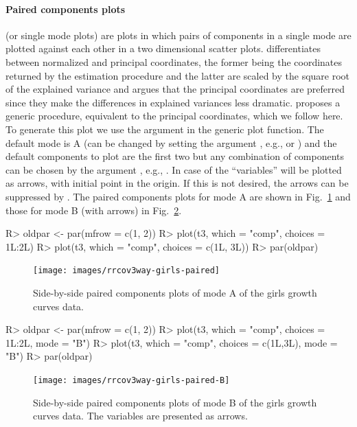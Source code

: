 \documentclass[article,shortnames, nojss]{jss}
\begin{document}
\paragraph{Paired components plots} (or single mode plots)
are plots in which pairs of components in a single mode
are plotted against each other in a two dimensional scatter plots.
\citet{kroonenberg:2008} differentiates between normalized
and principal coordinates, the former being the coordinates
returned by the estimation procedure and the latter are scaled
by the square root of the explained variance and argues that the
principal coordinates are preferred since they make the differences
in explained variances less dramatic. \citet{kiers2000some} proposes
a generic procedure, equivalent to the principal coordinates,
which we follow here. To generate this plot we use the argument
 in the generic plot function. The default
mode is A (can be changed by setting the argument ,
e.g.,  or  ) and the default components to
plot are the first two but any combination of components can be chosen by
the argument , e.g., . In case of
 the ``variables'' will be plotted as arrows, with
initial point in the origin. If this is not desired, the arrows can be suppressed
by . The paired components plots for mode A are shown
in Fig.~\ref{fig-girls-paired} and those for mode B (with arrows) in
Fig.~\ref{fig-girls-paired-B}.
\begin{Schunk}
\begin{Sinput}
R> oldpar <- par(mfrow = c(1, 2))
R> plot(t3, which = "comp", choices = 1L:2L)
R> plot(t3, which = "comp", choices = c(1L, 3L))
R> par(oldpar)
\end{Sinput}
\end{Schunk}
\begin{figure}[H]
\centering
\texttt{[image: images/rrcov3way-girls-paired]}
\caption{Side-by-side paired components plots of mode A of the girls growth curves data.}
\label{fig-girls-paired}
\end{figure}
\begin{Schunk}
\begin{Sinput}
R> oldpar <- par(mfrow = c(1, 2))
R> plot(t3, which = "comp", choices = 1L:2L, mode = "B")
R> plot(t3, which = "comp", choices = c(1L,3L), mode = "B")
R> par(oldpar)
\end{Sinput}
\end{Schunk}
\begin{figure}[H]
\centering
\texttt{[image: images/rrcov3way-girls-paired-B]}
\caption{Side-by-side paired components plots of mode B of the girls
growth curves data. The variables are presented as arrows.}
\label{fig-girls-paired-B}
\end{figure}
\end{document}
